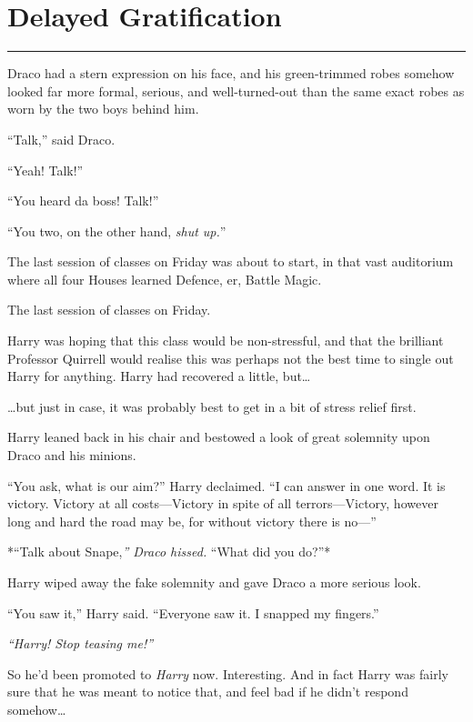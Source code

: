 \chapter{Delayed Gratification}\label{delayed-gratification}

\begin{center}\rule{3in}{0.4pt}\end{center}

Draco had a stern expression on his face, and his green-trimmed robes
somehow looked far more formal, serious, and well-turned-out than the
same exact robes as worn by the two boys behind him.

``Talk,'' said Draco.

``Yeah! Talk!''

``You heard da boss! Talk!''

``You two, on the other hand, \emph{shut up.}''

The last session of classes on Friday was about to start, in that vast
auditorium where all four Houses learned Defence, er, Battle Magic.

The last session of classes on Friday.

Harry was hoping that this class would be non-stressful, and that the
brilliant Professor Quirrell would realise this was perhaps not the best
time to single out Harry for anything. Harry had recovered a little,
but\ldots{}

\ldots{}but just in case, it was probably best to get in a bit of stress
relief first.

Harry leaned back in his chair and bestowed a look of great solemnity
upon Draco and his minions.

``You ask, what is our aim?'' Harry declaimed. ``I can answer in one
word. It is victory. Victory at all costs---Victory in spite of all
terrors---Victory, however long and hard the road may be, for without
victory there is no---''

*``Talk about Snape,\emph{'' Draco hissed. }``What did you do?''*

Harry wiped away the fake solemnity and gave Draco a more serious look.

``You saw it,'' Harry said. ``Everyone saw it. I snapped my fingers.''

\emph{``Harry! Stop teasing me!''}

So he'd been promoted to \emph{Harry} now. Interesting. And in fact
Harry was fairly sure that he was meant to notice that, and feel bad if
he didn't respond somehow\ldots{}

